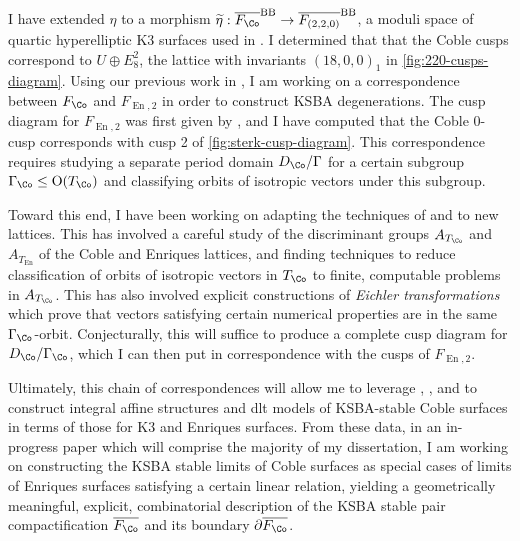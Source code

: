 \documentclass{amsart}
\renewcommand{\tilde}{\widetilde}
\begin{document}
\begin{remark}

I have extended \(\eta\) to a morphism \(\tilde \eta: \overline{  F_{\Co} }^{\operatorname{BB}} \to \overline{  F_{(2,2,0)}  }^{\operatorname{BB}}\), a moduli space of quartic hyperelliptic K3 surfaces used in \cite{AEGS23}. I determined that that the Coble cusps correspond to \(U\oplus E_8^2\), the lattice with invariants \((18, 0, 0)_1\) in \cref{fig:220-cusps-diagram}. Using our previous work in \cite{AEGS23}, I am working on a correspondence between \(F_{\Co}\) and \(F_{\operatorname{En}, 2}\) in order to construct KSBA degenerations. The cusp diagram for \(F_{\operatorname{En}, 2}\) was first given by \cite{Ste91}, and I have computed that the Coble 0-cusp corresponds with cusp 2 of \cref{fig:sterk-cusp-diagram}. This correspondence requires studying a separate period domain \(D_{\Co}/\Gamma\) for a certain subgroup \(\Gamma_{\Co} \leq {\operatorname{O}}(T_{\Co})\) and classifying orbits of isotropic vectors under this subgroup.

Toward this end, I have been working on adapting the techniques of \cite{Ste91} and \cite{scattone1987on-the-compactification-of-moduli} to new lattices. This has involved a careful study of the discriminant groups \(A_{T_{\Co}}\) and \(A_{T_{\operatorname{En}}}\) of the Coble and Enriques lattices, and finding techniques to reduce classification of orbits of isotropic vectors in \(T_{\Co}\) to finite, computable problems in \(A_{T_{\Co}}\). This has also involved explicit constructions of \emph{Eichler transformations} which prove that vectors satisfying certain numerical properties are in the same \(\Gamma_{\Co}\)-orbit. Conjecturally, this will suffice to produce a complete cusp diagram for \(D_{\Co}/\Gamma_{\Co}\), which I can then put in correspondence with the cusps of \(F_{\operatorname{En}, 2}\).

Ultimately, this chain of correspondences will allow me to leverage \cite{AEGS23}, \cite{AT21}, and \cite{AE22} to construct integral affine structures and dlt models of KSBA-stable Coble surfaces in terms of those for K3 and Enriques surfaces. From these data, in an in-progress paper which will comprise the majority of my dissertation, I am working on constructing the KSBA stable limits of Coble surfaces as special cases of limits of Enriques surfaces satisfying a certain linear relation, yielding a geometrically meaningful, explicit, combinatorial description of the KSBA stable pair compactification \(\overline{F_{\Co}}\) and its boundary \(\partial \overline{F_{\Co}}\).


\end{remark}
\end{document}
